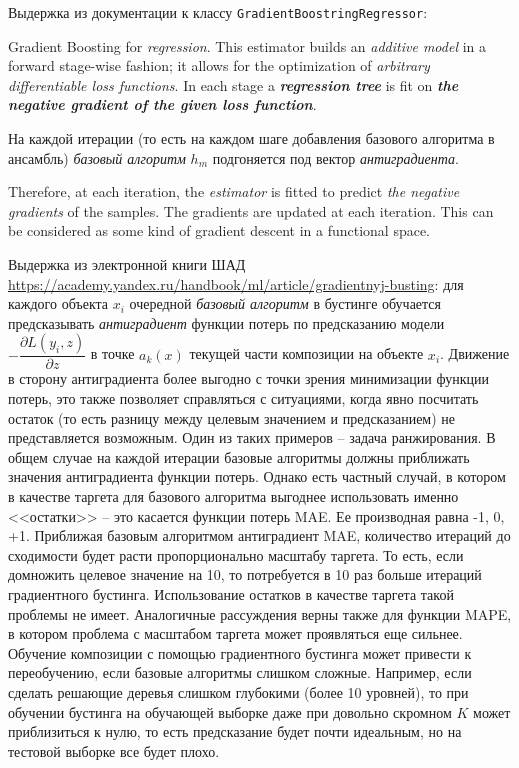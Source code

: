 \documentclass[%
	11pt,
	a4paper,
	utf8,
		]{article}
\begin{document}
\vspace*{3mm}
Выдержка из документации к классу \verb|GradientBoostringRegressor|:

Gradient Boosting for \emph{\color{blue}regression}. This estimator builds an \emph{additive model} in a forward stage-wise fashion; it allows for the optimization of \emph{arbitrary differentiable loss functions}. In each stage a \emph{\bfseries regression tree} is fit on \emph{\bfseries the negative gradient of the given loss function}.

На каждой итерации (то есть на каждом шаге добавления базового алгоритма в ансамбль) \emph{базовый алгоритм} $ h_m $ подгоняется под вектор \emph{антиградиента}.

Therefore, at each iteration, the \emph{estimator} is fitted to predict \emph{the negative gradients} of the samples. The gradients are updated at each iteration. This can be considered as some kind of gradient descent in a functional space.

Выдержка из электронной книги ШАД \url{https://academy.yandex.ru/handbook/ml/article/gradientnyj-busting}: для каждого объекта $ x_i $ очередной \emph{базовый алгоритм} в бустинге обучается предсказывать \emph{антиградиент} функции потерь по предсказанию модели $ - \dfrac{\partial L(y_i, z)}{ \partial z } $ в точке $ a_k(x) $ текущей части композиции на объекте $ x_i $. Движение в сторону антиградиента более выгодно с точки зрения минимизации функции потерь, это также позволяет справляться с ситуациями, когда явно посчитать остаток (то есть разницу между целевым значением и предсказанием) не представляется возможным. Один из таких примеров -- задача ранжирования. В общем случае на каждой итерации базовые алгоритмы должны приближать значения антиградиента функции потерь. Однако есть частный случай, в котором в качестве таргета для базового алгоритма выгоднее использовать именно <<остатки>> -- это касается функции потерь MAE. Ее производная равна -1, 0, +1. Приближая базовым алгоритмом антиградиент MAE, количество итераций до сходимости будет расти пропорционально масштабу таргета. То есть, если домножить целевое значение на 10, то потребуется в 10 раз больше итераций градиентного бустинга. Использование остатков в качестве таргета такой проблемы не имеет. Аналогичные рассуждения верны также для функции MAPE, в котором проблема с масштабом таргета может проявляться еще сильнее. Обучение композиции с помощью градиентного бустинга может привести к переобучению, если базовые алгоритмы слишком сложные. Например, если сделать решающие деревья слишком глубокими (более 10 уровней), то при обучении бустинга на обучающей выборке даже при довольно скромном $ K $ может приблизиться к нулю, то есть предсказание будет почти идеальным, но на тестовой выборке все будет плохо.
\end{document}

